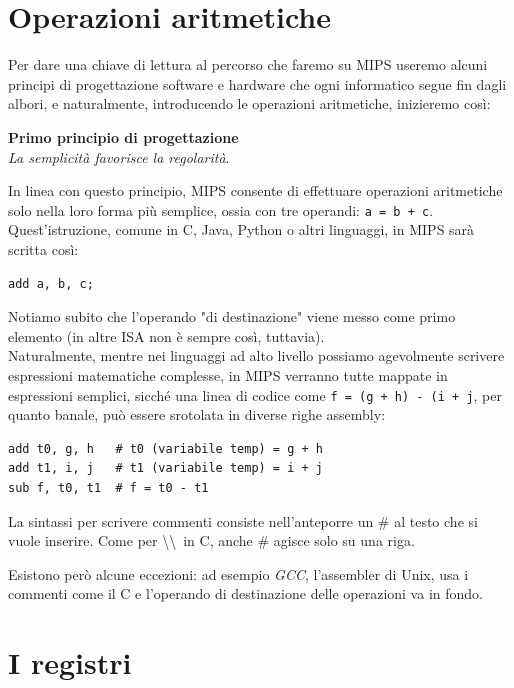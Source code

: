 \documentclass[class=book, crop=false]{standalone}
\begin{document}
\section{Operazioni aritmetiche}
Per dare una chiave di lettura al percorso che faremo su MIPS useremo alcuni principi di progettazione software e hardware che ogni informatico segue fin dagli albori, e naturalmente, introducendo le operazioni aritmetiche, inizieremo così:

\vspace{8pt}
\begin{tcolorbox}
\centering
\textbf{Primo principio di progettazione}\\
\emph{La semplicità favorisce la regolarità}.
\end{tcolorbox}
\vspace{5pt}

In linea con questo principio, MIPS consente di effettuare operazioni aritmetiche solo nella loro forma più semplice, ossia con tre operandi: \texttt{a = b + c}.
Quest'istruzione, comune in C, Java, Python o altri linguaggi, in MIPS sarà scritta così:
\begin{verbatim}
add a, b, c;
\end{verbatim}

Notiamo subito che l'operando "di destinazione" viene messo come primo elemento (in altre ISA non è sempre così, tuttavia).\\
Naturalmente, mentre nei linguaggi ad alto livello possiamo agevolmente scrivere espressioni matematiche complesse, in MIPS verranno tutte mappate in espressioni semplici, sicché una linea di codice come \texttt{f = (g + h) - (i + j}, per quanto banale, può essere srotolata in diverse righe assembly:

\begin{verbatim}
add t0, g, h   # t0 (variabile temp) = g + h
add t1, i, j   # t1 (variabile temp) = i + j
sub f, t0, t1  # f = t0 - t1
\end{verbatim}

La sintassi per scrivere commenti consiste nell'anteporre un \# al testo che si vuole inserire. Come per \textbackslash\textbackslash~in C, anche \# agisce solo su una riga.

Esistono però alcune eccezioni: ad esempio \emph{GCC}, l'assembler di Unix, usa i commenti come il C e l'operando di destinazione delle operazioni va in fondo.

\section{I registri}
\end{document}
